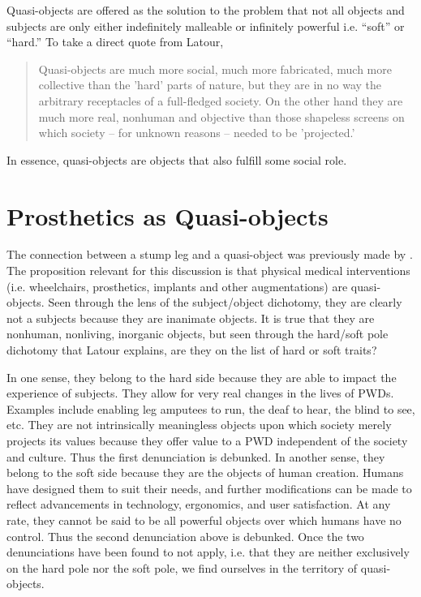\documentclass[a4paper]{article}
\begin{document}
\begin{appendices}
Quasi-objects are offered as the solution to the problem that not all objects
and subjects are only either indefinitely malleable or infinitely powerful
i.e. ``soft'' or ``hard.'' To take a direct quote from Latour,
%
\begin{quote}
Quasi-objects are much more social, much more fabricated, much more
collective than the 'hard' parts of nature, but they are in no way the
arbitrary receptacles of a full-fledged society. On the other hand they are
much more real, nonhuman and objective than those shapeless screens on which
society – for unknown reasons – needed to be 'projected.' \citep{latour2012we}
\end{quote}
%
In essence, quasi-objects are objects that also fulfill some social role.


\newpage
\section{Prosthetics as Quasi-objects}
\label{pros-quasi}

The connection between a stump leg and a quasi-object was previously made by
\cite{bertram2018bestial}. The proposition relevant for this discussion is
that physical medical interventions (i.e. wheelchairs, prosthetics, implants
and other augmentations) are quasi-objects. Seen through the lens of the
subject/object dichotomy, they are clearly not a subjects because they are
inanimate objects. It is true that they are nonhuman, nonliving, inorganic
objects, but seen through the hard/soft pole dichotomy that Latour explains,
are they on the list of hard or soft traits?

In one sense, they belong to the hard side because they are able to impact the
experience of subjects. They allow for very real changes in the lives of PWDs.
Examples include enabling leg amputees to run, the deaf to hear, the blind to
see, etc. They are not intrinsically meaningless objects upon which society
merely projects its values because they offer value to a PWD independent of
the society and culture. Thus the first denunciation is debunked. In another
sense, they belong to the soft side because they are the objects of human
creation. Humans have designed them to suit their needs, and further
modifications can be made to reflect advancements in technology, ergonomics,
and user satisfaction. At any rate, they cannot be said to be all powerful
objects over which humans have no control. Thus the second denunciation above
is debunked. Once the two denunciations have been found to not apply, i.e.
that they are neither exclusively on the hard pole nor the soft pole, we find
ourselves in the territory of quasi-objects.

\end{appendices}
\end{document}
